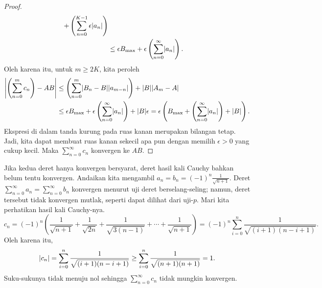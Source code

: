 \begin{proof}
\begin{equation*}
\begin{split}
+
\left(
\sum_{n=0}^{K-1}
  \epsilon \lvert {a_{n}} \rvert
\right)
\\
& \leq
\epsilon
B_{\text{max}}
+
\epsilon
\left(
\sum_{n=0}^\infty \lvert {a_{n}} \rvert
\right) .
\end{split}
\end{equation*}
Oleh karena itu, untuk $m \geq 2K$, kita peroleh
\begin{equation*}
\begin{split}
\left\lvert {\left(\sum_{n=0}^m c_n \right) - AB} \right\rvert
& \leq
\left(
\sum_{n=0}^m
  \lvert { B_n -  B } \rvert \lvert {a_{m-n}} \rvert
\right)
+
\lvert {B} \rvert\lvert {A_m - A} \rvert
\\
& \leq
\epsilon
B_{\text{max}}
+
\epsilon
\left(
\sum_{n=0}^\infty \lvert {a_{n}} \rvert
\right)
+
\lvert {B} \rvert\epsilon
=
\epsilon 
\left(
B_{\text{max}}
+
\left(
\sum_{n=0}^\infty \lvert {a_{n}} \rvert
\right)
+
\lvert {B} \rvert
\right) .
\end{split}
\end{equation*}
Ekspresi di dalam tanda kurung pada ruas kanan
merupakan bilangan tetap.
Jadi,
kita dapat membuat ruas kanan sekecil apa pun dengan memilih
$\epsilon> 0$ yang cukup kecil.  Maka $\sum_{n=0}^\infty c_n$ konvergen ke $AB$.
\end{proof}

\begin{example}
Jika kedua deret hanya konvergen bersyarat, deret hasil kali Cauchy
bahkan belum tentu konvergen.
Andaikan kita mengambil $a_n = b_n = {(-1)}^n \frac{1}{\sqrt{n+1}}$.
Deret $\sum_{n=0}^\infty a_n = \sum_{n=0}^\infty b_n$
konvergen
menurut uji deret berselang-seling; namun, deret tersebut tidak konvergen
mutlak, seperti dapat dilihat dari uji-$p$.  Mari kita perhatikan
hasil kali Cauchy-nya.
\begin{equation*}
c_n
= 
{(-1)}^n
\left(
\frac{1}{\sqrt{n+1}} + 
\frac{1}{\sqrt{2n}} + 
\frac{1}{\sqrt{3(n-1)}} + \cdots +
\frac{1}{\sqrt{n+1}}
\right)
=
{(-1)}^n
\sum_{i=0}^n \frac{1}{\sqrt{(i+1)(n-i+1)}} .
\end{equation*}
Oleh karena itu,
\begin{equation*}
\lvert {c_n} \rvert 
=
\sum_{i=0}^n \frac{1}{\sqrt{(i+1)(n-i+1)}} 
\geq
\sum_{i=0}^n \frac{1}{\sqrt{(n+1)(n+1)}} 
= 1 .
\end{equation*}
Suku-sukunya tidak menuju nol sehingga $\sum_{n=0}^\infty c_n$ tidak mungkin konvergen.
\end{example}

